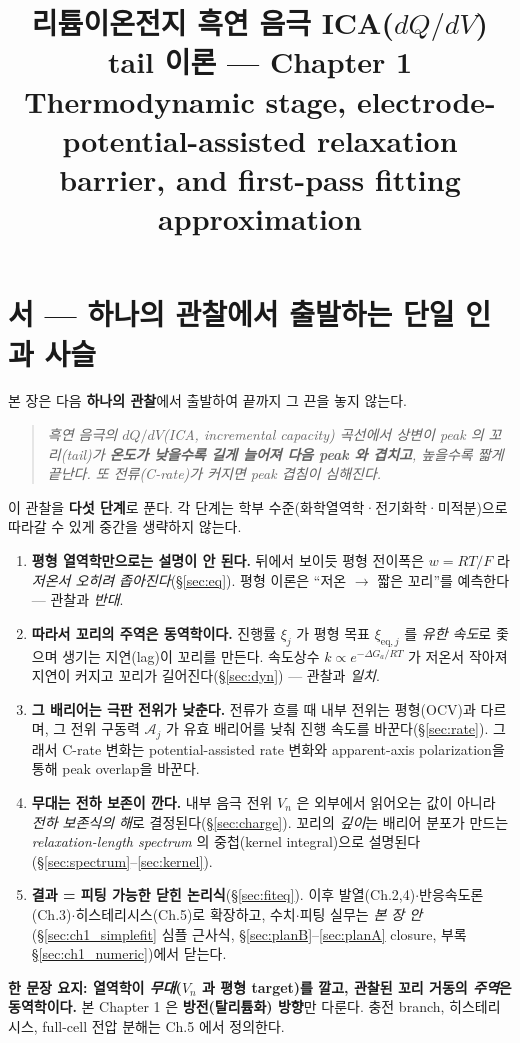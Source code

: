 \documentclass[11pt,a4paper]{article}
\title{\textbf{리튬이온전지 흑연 음극 ICA($dQ/dV$) tail 이론 --- Chapter 1}\\[0.4em]
\large Thermodynamic stage, electrode-potential-assisted relaxation barrier, and first-pass fitting approximation}
\author{}\date{}
\newcommand{\eq}{\mathrm{eq}}
\begin{document}
\maketitle

\section*{서 — 하나의 관찰에서 출발하는 단일 인과 사슬}
본 장은 다음 \textbf{하나의 관찰}에서 출발하여 끝까지 그 끈을 놓지 않는다.
\begin{quote}\itshape
흑연 음극의 $dQ/dV$(ICA, incremental capacity) 곡선에서 상변이 peak 의 꼬리(tail)가 \textbf{온도가
낮을수록 길게 늘어져 다음 peak 와 겹치고}, 높을수록 짧게 끝난다. 또 전류(C-rate)가 커지면 peak 겹침이
심해진다.
\end{quote}
이 관찰을 \textbf{다섯 단계}로 푼다. 각 단계는 학부 수준(화학열역학·전기화학·미적분)으로 따라갈 수 있게
중간을 생략하지 않는다.
\begin{enumerate}[label=\textbf{(\arabic*)},leftmargin=2.2em]
\item \textbf{평형 열역학만으로는 설명이 안 된다.} 뒤에서 보이듯 평형 전이폭은 $w=RT/F$ 라 \emph{저온서
  오히려 좁아진다}(\S\ref{sec:eq}). 평형 이론은 ``저온 $\to$ 짧은 꼬리''를 예측한다 — 관찰과 \emph{반대}.
\item \textbf{따라서 꼬리의 주역은 동역학이다.} 진행률 $\xi_j$ 가 평형 목표 $\xi_{\eq,j}$ 를 \emph{유한
  속도}로 좇으며 생기는 지연(lag)이 꼬리를 만든다. 속도상수 $k\propto e^{-\Delta G_a/RT}$ 가 저온서
  작아져 지연이 커지고 꼬리가 길어진다(\S\ref{sec:dyn}) — 관찰과 \emph{일치}.
\item \textbf{그 배리어는 극판 전위가 낮춘다.} 전류가 흐를 때 내부 전위는 평형(OCV)과 다르며, 그 전위
  구동력 $\mathcal A_j$ 가 유효 배리어를 낮춰 진행 속도를 바꾼다(\S\ref{sec:rate}). 그래서 C-rate 변화는 potential-assisted rate 변화와 apparent-axis polarization을 통해 peak overlap을 바꾼다.
\item \textbf{무대는 전하 보존이 깐다.} 내부 음극 전위 $V_n$ 은 외부에서 읽어오는 값이 아니라 \emph{전하
  보존식의 해}로 결정된다(\S\ref{sec:charge}). 꼬리의 \emph{깊이}는 배리어 분포가 만드는
  \emph{relaxation-length spectrum} 의 중첩(kernel integral)으로 설명된다(\S\ref{sec:spectrum}--\ref{sec:kernel}).
\item \textbf{결과 = 피팅 가능한 닫힌 논리식}(\S\ref{sec:fiteq}). 이후 발열(Ch.2,4)$\cdot$반응속도론
  (Ch.3)$\cdot$히스테리시스(Ch.5)로 확장하고, 수치$\cdot$피팅 실무는 \emph{본 장 안}(\S\ref{sec:ch1_simplefit} 심플
근사식, \S\ref{sec:planB}--\ref{sec:planA} closure, 부록 \S\ref{sec:ch1_numeric})에서 닫는다.
\end{enumerate}
\noindent\textbf{한 문장 요지: 열역학이 \emph{무대}($V_n$ 과 평형 target)를 깔고, 관찰된 꼬리 거동의
\emph{주역}은 동역학이다.} 본 Chapter 1 은 \textbf{방전(탈리튬화) 방향}만 다룬다. 충전 branch,
히스테리시스, full-cell 전압 분해는 Ch.5 에서 정의한다.
\end{document}
